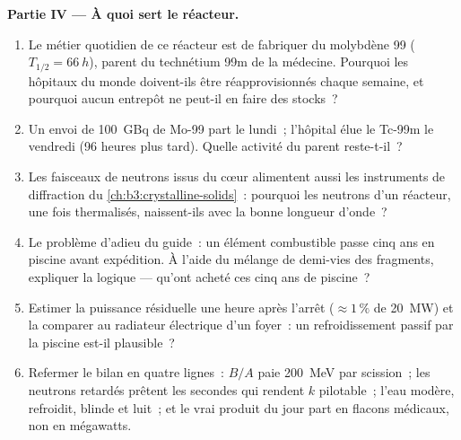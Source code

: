 \begin{problem}
\medskip\noindent\textbf{Partie IV --- À quoi sert le réacteur.}

\begin{enumerate}[resume]
  \item Le métier quotidien de ce réacteur est de fabriquer du
        molybdène 99 ($T_{1/2} = \qty{66}{h}$), parent du
        technétium 99m de la médecine. Pourquoi les hôpitaux du
        monde doivent-ils être réapprovisionnés chaque semaine, et
        pourquoi aucun entrepôt ne peut-il en faire des stocks~?
  \item Un envoi de \qty{100}{GBq} de Mo-99 part le lundi~;
        l'hôpital élue le Tc-99m le vendredi (96 heures plus tard).
        Quelle activité du parent reste-t-il~?
  \item Les faisceaux de neutrons issus du cœur alimentent aussi les
        instruments de diffraction du
        \cref{ch:b3:crystalline-solids}~: pourquoi les neutrons d'un
        réacteur, une fois thermalisés, naissent-ils avec la bonne
        longueur d'onde~?
  \item Le problème d'adieu du guide~: un élément combustible passe
        cinq ans en piscine avant expédition. À l'aide du mélange de
        demi-vies des fragments, expliquer la logique --- qu'ont
        acheté ces cinq ans de piscine~?
  \item Estimer la puissance résiduelle une heure après l'arrêt
        ($\approx1\,\%$ de \qty{20}{MW}) et la comparer au radiateur
        électrique d'un foyer~: un refroidissement passif par la
        piscine est-il plausible~?
  \item Refermer le bilan en quatre lignes~: $B/A$ paie
        \qty{200}{MeV} par scission~; les neutrons retardés prêtent
        les secondes qui rendent $k$ pilotable~; l'eau modère,
        refroidit, blinde et luit~; et le vrai produit du jour part
        en flacons médicaux, non en mégawatts.
\end{enumerate}
\end{problem}
